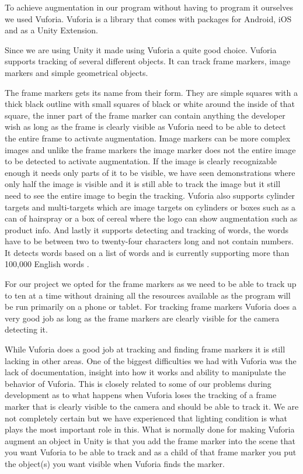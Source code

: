 To achieve augmentation in our program without having to program it ourselves we used Vuforia.
Vuforia is a library that comes with packages for Android, iOS and as a Unity Extension.

Since we are using Unity it made using Vuforia a quite good choice.
Vuforia supports tracking of several different objects. It can track frame markers, image markers and simple geometrical objects.

The frame markers gets its name from their form. They are simple squares with a thick black outline with small squares of black or white around the inside of that square, the inner part of the frame marker can
contain anything the developer wish as long as the frame is clearly visible as Vuforia need to be able to detect the entire frame to activate augmentation.
Image markers can be more complex images and unlike the frame markers the image marker does not the entire image to be detected to activate augmentation.
If the image is clearly recognizable enough it needs only parts of it to be visible, we have seen demonstrations where only half the image is visible and it is still able to track the image but it still need to see the entire image to begin the tracking.
Vuforia also supports cylinder targets and multi-targets which are image targets on cylinders or boxes such as a can of hairspray or a box of cereal where the logo can show augmentation such as product info.
And lastly it supports detecting and tracking of words, the words have to be between two to twenty-four characters long and not contain numbers.
It detects words based on a list of words and is currently supporting more than 100,000 English words \cite{VuforiaTextMarker}.

For our project we opted for the frame markers as we need to be able to track up to ten at a time without draining all the resources available as the program will be run primarily on a phone or tablet.
For tracking frame markers Vuforia does a very good job as long as the frame markers are clearly visible for the camera detecting it.

While Vuforia does a good job at tracking and finding frame markers it is still lacking in other areas.
One of the biggest difficulties we had with Vuforia was the lack of documentation, insight into how it works and ability to manipulate the behavior of Vuforia.
This is closely related to some of our problems during development as to what happens when Vuforia loses the tracking of a frame marker  that is clearly visible
 to the camera and should be able to track it.
We are not completely certain but we have experienced that lighting condition is what plays the most important role in this.
What is normally done for making Vuforia augment an object in Unity is that you add the frame marker into the scene that you want Vuforia to be able to track and as a child of that frame marker you 
put the object(s) you want visible when Vuforia finds the marker.

